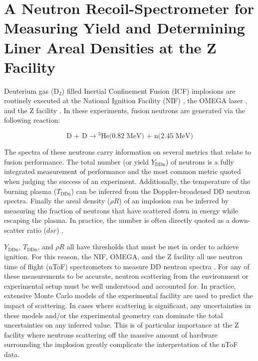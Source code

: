 \chapter{A Neutron Recoil-Spectrometer for Measuring Yield and Determining Liner Areal Densities at the Z Facility}

	Deuterium gas (D$_2$) filled Inertial Confinement Fusion (ICF) implosions are routinely executed at the National Ignition Facility (NIF) \cite{NIF_Ref}, the OMEGA laser \cite{OMEGA_Ref}, and the Z facility \cite{Z_Ref}. In these experiments, fusion neutrons are generated via the following reaction:

\begin{equation}
	\textrm{D + D} \rightarrow  \textrm{}^3\textrm{He(0.82 MeV) + n(2.45 MeV)}
\end{equation}

The spectra of these neutrons carry information on several metrics that relate to fusion performance. The total number (or yield $Y_{\mathrm{DDn}}$) of neutrons is a fully integrated measurement of performance and the most common metric quoted when judging the success of an experiment. Additionally, the temperature of the burning plasma ($T_{\mathrm{DDn}}$) can be inferred from the Doppler-broadened DD neutron spectra. \cite{Brysk_1973} Finally the areal density ($\rho R$) of an implosion can be inferred by measuring the fraction of neutrons that have scattered down in energy while escaping the plasma. In practice, the number is often directly quoted as a down-scatter ratio ($dsr$) \cite{rhoR_Ref, Gatu-Johnson_RSI_2012}.

$Y_{\mathrm{DDn}}$, $T_{\mathrm{DDn}}$, and $\rho R$ all have thresholds that must be met in order to achieve ignition. \cite{Lindl_PoP_1995} For this reason, the NIF, OMEGA, and the Z facility all use neutron time of flight (nToF) spectrometers to measure DD neutron spectra \cite{Glebov_RSI_2010, Leeper_Z_NTOFs, Hahn_Z_NTOFs, Glebov_RSI_2014}. For any of these measurements to be accurate, neutron scattering from the environment or experimental setup must be well understood and accounted for. In practice, extensive Monte Carlo models of the experimental facility are used to predict the impact of scattering. In cases where scattering is significant, any uncertainties in these models and/or the experimental geometry can dominate the total uncertainties on any inferred value. This is of particular importance at the Z facility where neutrons scattering off the massive amount of hardware surrounding the implosion greatly complicate the interpretation of the nToF data. 

